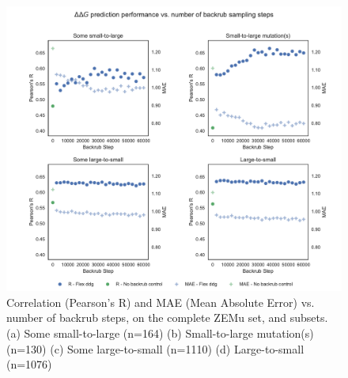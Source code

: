 \begin{figure}
  \includegraphics[width=\textwidth,keepaspectratio]{steps-v-corr_some_sizes.pdf}
  \caption[Flex ddG performance vs. number of backrub steps]{
    Correlation (Pearson's R) and MAE (Mean Absolute Error) vs. number of backrub steps, on the complete ZEMu set, and subsets.
    (a) Some small-to-large (n=164)
    (b) Small-to-large mutation(s) (n=130)
    (c) Some large-to-small (n=1110)
    (d) Large-to-small (n=1076)
  } \label{fig:steps-v-corr_some_sizes}
\end{figure}
